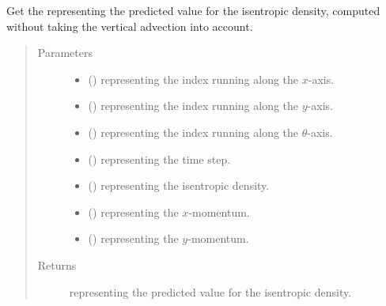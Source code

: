 \documentclass[letterpaper,10pt,english]{sphinxmanual}
\begin{document}
\begin{fulllineitems}
\begin{fulllineitems}
\label{\detokenize{api:dycore.flux_isentropic_maccormack.FluxIsentropicMacCormack._get_maccormack_horizontal_predicted_value_s}}
Get the  representing the predicted value for the isentropic density,
computed without taking the vertical advection into account.
\begin{quote}\begin{description}
\item[{Parameters}] \leavevmode\begin{itemize}
\item {} 
 () \textendash{}  representing the index running along the \(x\)-axis.

\item {} 
 () \textendash{}  representing the index running along the \(y\)-axis.

\item {} 
 () \textendash{}  representing the index running along the \(\theta\)-axis.

\item {} 
 () \textendash{}  representing the time step.

\item {} 
 () \textendash{}  representing the isentropic density.

\item {} 
 () \textendash{}  representing the \(x\)-momentum.

\item {} 
 () \textendash{}  representing the \(y\)-momentum.

\end{itemize}

\item[{Returns}] \leavevmode
{} representing the predicted value for the isentropic density.


\end{description}
\end{quote}
\end{fulllineitems}
\end{fulllineitems}
\end{document}
